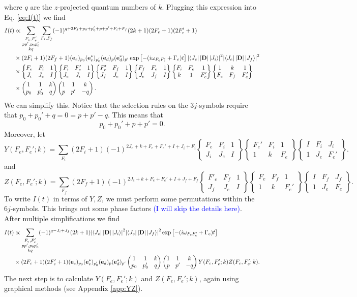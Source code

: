\documentclass[11pt]{article}
\newcommand{\lb}{\left[}
\newcommand{\rb}{\right]}
\newcommand{\tj}[6]{ \begin{pmatrix}
		#1 & #2 & #3 \\
		#4 & #5 & #6 
\end{pmatrix}}
\newcommand{\Gj}[6]{ \begin{Bmatrix}
		#1 & #2 & #3 \\
		#4 & #5 & #6 
\end{Bmatrix}}
\begin{document}
where $q$ are the $z$-projected quantum numbers of $k$. Plugging this expression into Eq. \ref{eq:I(t)} we find 
\begin{align*}
I(t) 
&\propto
\sum_{\substack{F_e, F'_e\\pp', p_0p'_0\\kq}}
\sum_{F_i, F_f}
(-1)^{q + 2F_f + p_0 + p'_0 + p + p'  + F_i + F_f}
(2k+1)(2F_e + 1)(2F'_e+1)\\
&\times (2F_i + 1)(2F_f+1)
(\mathbf{e}_e)_{p_0}(\mathbf{e}^*_e)_{p_0'}(\mathbf{e}_d)_{p}(\mathbf{e}_d^*)_{p'} \exp\lb -(i\omega_{F_eF'_e} + \Gamma_e)t \rb\abs{\bra{J_e} \abs{\mathbf{D}}\ket{J_i}}^2\abs{ \bra{J_e} \abs{\mathbf{D}} \ket{J_f}}^2\\
&\times \Gj{F_e}{F_i}{1}{J_i}{J_e}{I}\Gj{F_i}{F'_e}{1}{J_e}{J_i}{I}\Gj{F'_e}{F_f}{1}{J_f}{J_e}{I}\Gj{F_f}{F_e}{1}{J_e}{J_f}{I}\Gj{F_i}{F_e}{1}{k}{1}{F_e'} \Gj{1}{k}{1}{F_e}{F_f}{F_e'}\\
&\times \tj{1}{1}{k}{p_0}{p_0'}{q}\tj{1}{1}{k}{p}{p'}{-q}.
\end{align*}
We can simplify this. Notice that the selection rules on the $3j$-symbols require that $p_0 + p_0' + q = 0 = p + p' - q$. This means that
\begin{equation*}
p_0 + p_0' + p + p' = 0.
\end{equation*}
Moreover, let 
\begin{equation*}
Y(F_e, F_e';k) = \sum_{F_i}(2F_i + 1)(-1)^{2J_e + k + F_e + F_e' + I + J_i + F_i}
\Gj{F_e}{F_i}{1}{J_i}{J_e}{I}
\Gj{F_e'}{F_i}{1}{1}{k}{F_e}
\Gj{I}{F_i}{J_i}{1}{J_e}{F_e'}.
\end{equation*}
and
\begin{equation*}
Z(F_e, F_e';k) = \sum_{F_f}(2F_f + 1)(-1)^{2J_e + k + F_e + F_e' + I + J_f + F_f}
\Gj{F'_e}{F_f}{1}{J_f}{J_e}{I}
\Gj{F_e}{F_f}{1}{1}{k}{F_e'}
\Gj{I}{F_f}{J_f}{1}{J_e}{F_e}.
\end{equation*}
To write $I(t)$ in terms of $Y,Z$, we must perform some permutations within the $6j$-symbols. This brings out some phase factors \textcolor{blue}{(I will skip the details here)}. After multiple simplifications we find
\begin{align*}
I(t) 
&\propto
\sum_{\substack{F_e, F'_e\\pp', p_0p'_0\\kq}}
(-1)^{q - J_i + J_f}
(2k+1)\abs{\bra{J_e} \abs{\mathbf{D}}\ket{J_i}}^2\abs{ \bra{J_e} \abs{\mathbf{D}} \ket{J_f}}^2 \exp\lb -(i\omega_{F_eF'_e} + \Gamma_e)t \rb\\
&\times 
(2F_e+1)(2F'_e+1)
(\mathbf{e}_e)_{p_0}(\mathbf{e}^*_e)_{p_0'}(\mathbf{e}_d)_{p}(\mathbf{e}_d^*)_{p'} 
\tj{1}{1}{k}{p_0}{p_0'}{q}\tj{1}{1}{k}{p}{p'}{-q}Y(F_e,F_e';k)Z(F_e,F_e';k).
\end{align*}
The next step is to calculate $Y(F_e,F_e';k)$ and $Z(F_e, F_e';k)$, again using graphical methods (see Appendix \ref{app:YZ}).
\end{document}
